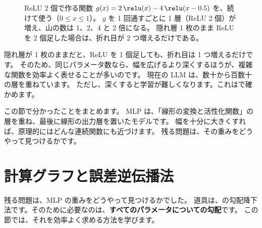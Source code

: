 \begin{figure}[tbp]
\centering
{}
\caption{ReLU 2 個で作る関数 $g(x)=2\,\relu(x)-4\,\relu(x-0.5)$ を、続けて使う（$0\le x\le 1$）。
$g$ を 1 回通すごとに 1 層（ReLU 2 個）が増え、山の数は 1、2、4 と 2 倍になる。
隠れ層 1 枚のまま ReLU を 2 個足した場合は、折れ目が 2 つ増えるだけである。}
\label{fig:nn-fold}
\end{figure}
隠れ層が 1 枚のままだと、ReLU を 1 個足しても、折れ目は 1 つ増えるだけです。
そのため、同じパラメータ数なら、幅を広げるより深くするほうが、複雑な関数を効率よく表せることが多いのです\cite{goodfellow2016deep}。
現在の LLM は、数十から百数十の層を重ねています。
ただし、深くすると学習が難しくなります。これはで確かめます。

この節で分かったことをまとめます。
MLP は、「線形の変換と活性化関数」の層を重ね、最後に線形の出力層を置いたモデルです。
幅を十分に大きくすれば、原理的にはどんな連続関数にも近づけます。
残る問題は、その重みをどうやって見つけるかです。

\section{計算グラフと誤差逆伝播法}\label{sec:nn-backprop}

残る問題は、MLP の重みをどうやって見つけるかでした。
道具は、の勾配降下法です。そのために必要なのは、\textbf{すべてのパラメータについての勾配}です。
この節では、それを効率よく求める方法を学びます。

